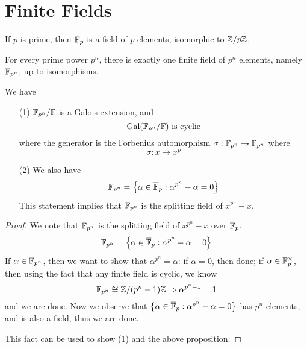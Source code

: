 \chapter{Finite Fields}
If $p$ is prime, then $\mathbb{F}_p$ is a field of $p$ elements, isomorphic to $\mathbb{Z}/p\mathbb{Z}$.
\begin{prop}[Fact]
    For every prime power $p^n$, there is exactly one finite field of $p^n$ elements, namely $\mathbb{F}_{p^n}$, up to isomorphisms.
\end{prop}
\begin{thm}
    We have 
    \begin{itemize}
        \item[(1)] $\mathbb{F}_{p^n}/\mathbb{F}$ is a Galois extension, and 
        \begin{equation*}
            \text{Gal}(\mathbb{F}_{p^n}/\mathbb{F}) \text{ is cyclic}
        \end{equation*}
        where the generator is the Forbenius automorphism $\sigma: \mathbb{F}_{p^n}\to\mathbb{F}_{p^n}$ where 
        \begin{equation*}
            \sigma: x\mapsto x^p
        \end{equation*}
        \item[(2)] We also have 
        \begin{equation*}
            \mathbb{F}_{p^n}=\left\{\alpha\in\overline{\mathbb{F}}_p: \alpha^{p^n}-\alpha=0\right\}
        \end{equation*}
        This statement implies that $
        \mathbb{F}_{p^n}$ is the splitting field of $x^{p^n}-x$.
    \end{itemize}
    

\end{thm}
\begin{proof}
    We note that $\mathbb{F}_{p^n}$ is the splitting field of $x^{p^n}-x$ over $\mathbb{F}_p$.  
    \begin{equation*}
        \mathbb{F}_{p^n}=\left\{\alpha\in\overline{\mathbb{F}}_p: \alpha^{p^n}-\alpha=0\right\}
    \end{equation*}
    If $\alpha\in\mathbb{F}_{p^n}$, then we want to show that $\alpha^{p^n}=\alpha$: if $\alpha=0$, then done; if $\alpha\in\mathbb{F}_p^\times$, then using the fact that any finite field is cyclic, we know 
    \begin{equation*}
        \mathbb{F}_{p^n}\cong\mathbb{Z}/(p^n-1)\mathbb{Z}\Rightarrow \alpha^{p^n-1}=1
    \end{equation*}
    and we are done. Now we observe that 
   $ \left\{\alpha\in\overline{\mathbb{F}}_p: \alpha^{p^n}-\alpha=0\right\}$ has $p^n$ elements, and is also a field, thus we are done.

   This fact can be used to show (1) and the above proposition.
\end{proof}


